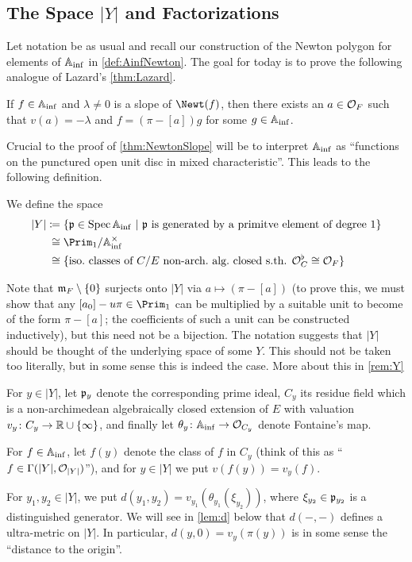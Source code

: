 \documentclass[a4paper, 10pt, oneside, DIV=9, chapterprefix=true, numbers=enddot,bibliography=totoc]{scrbook}
\begin{document}
\subsection{The Space \texorpdfstring{$|Y|$}{|Y|} and Factorizations}
Let notation be as usual and recall our construction of the Newton polygon for elements of $\mathbb{A}_{\mathrm{inf}}$ in \cref{def:AinfNewton}. The goal for today is to prove the following analogue of Lazard's \cref{thm:Lazard}.
\begin{thm}\label{thm:NewtonSlope}
	If $f\in\mathbb{A}_{\mathrm{inf}}$ and $\lambda\neq 0$ is a slope of $\Newt(f)$, then there exists an $a\in\mathcal{O}_F$ such that $v(a)=-\lambda$ and $f=(\pi-[a])g$ for some $g\in\mathbb{A}_{\mathrm{inf}}$.
\end{thm}
Crucial to the proof of \cref{thm:NewtonSlope} will be to interpret $\mathbb{A}_{\mathrm{inf}}$ as \enquote{functions on the punctured open unit disc in mixed characteristic}. This leads to the following definition.
\begin{defi}
	We define the space
	\begin{align*}
		|Y|&\coloneqq\left\{\pp\in\Spec\IA_\inf\st\pp\text{ is generated by a primitve element of degree $1$}\right\}\\
		&\mathrel{{\phantom{\coloneqq}}\mathllap{\cong}} \Prim_1/\IA_\inf^\times\\
		&\mathrel{{\phantom{\coloneqq}}\mathllap{\cong}}\{\text{iso.\ classes of }C/E\text{ non-arch.\ alg.\ closed s.th. }\Oo_C^\flat\cong \Oo_F\}
	\end{align*}
\end{defi}
Note that $\mathfrak{m}_F\setminus\{0\}$ surjects onto $|Y|$ via $a\mapsto(\pi-[a])$ (to prove this, we must show that any $[a_0]-u\pi\in\Prim_1$ can be multiplied by a suitable unit to become of the form $\pi-[a]$; the coefficients of such a unit can be constructed inductively), but this need not be a bijection. The notation suggests that $|Y|$ should be thought of the underlying space of some $Y$. This should not be taken too literally, but in some sense this is indeed the case. More about this in \cref{rem:Y}
\begin{nota}
	\begin{numerate}
		\item For $y\in|Y|$, let $\mathfrak{p}_y$ denote the corresponding prime ideal, $C_y$ its residue field which is a non-archimedean algebraically closed extension of $E$ with valuation $v_y\colon C_y\morphism \IR\cup\{\infty\}$, and finally let $\theta_y\colon \IA_\inf\morphism\Oo_{C_y}$  denote Fontaine's map.
		\item For $f\in\mathbb{A}_{\mathrm{inf}}$, let $f(y)$ denote the class of $f$ in $C_y$ (think of this as \enquote{$f\in\operatorname{\Gamma}(|Y|,\mathcal{O}_{|Y|})$}), and for $y\in |Y|$ we put $v(f(y))=v_y(f)$.
		\item For $y_1,y_2\in|Y|$, we put $d(y_1,y_2)=v_{y_1}(\theta_{y_1}(\xi_{y_2}))$, where $\xi_{y_2}\in\mathfrak{p}_{y_2}$ is a distinguished generator. We will see in \cref{lem:d} below that $d(-,-)$ defines a ultra-metric on $|Y|$. In particular, $d(y,0)=v_y(\pi(y))$ is in some sense the \enquote{distance to the origin}.
	\end{numerate}
\end{nota}
\end{document}
